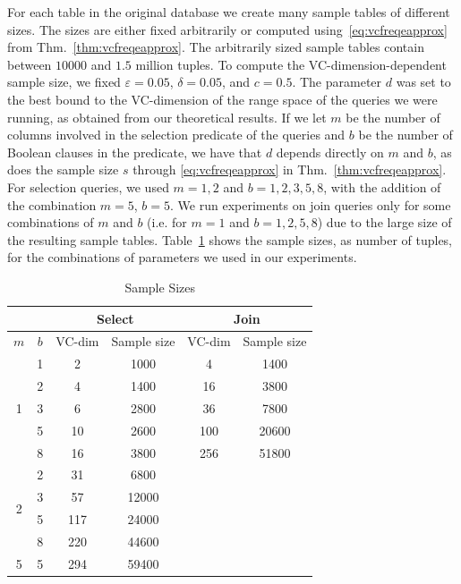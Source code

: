 For each table in the original database we create many sample tables of
different sizes. The sizes are either fixed arbitrarily or computed
using~\eqref{eq:vcfreqeapprox} from Thm.~\ref{thm:vcfreqeapprox}. The arbitrarily sized
sample tables contain between $10000$ and $1.5$ million tuples. To compute the
VC-dimension-dependent sample size, we fixed $\varepsilon=0.05$,
$\delta=0.05$, and $c=0.5$. The parameter $d$ was set to the best bound to the
VC-dimension of the range space of the queries we were running, as obtained from
our theoretical results. If we let $m$ be the number of columns involved in the
selection predicate of the queries and $b$ be the number of Boolean clauses in
the predicate, we have that $d$ depends directly on $m$ and $b$, as does the
sample size $s$ through \eqref{eq:vcfreqeapprox} in Thm.~\ref{thm:vcfreqeapprox}. For
selection queries, we used $m=1,2$ and $b=1,2,3,5,8$, with the addition of the
combination $m=5$, $b=5$. We run experiments on join queries only for some
combinations of $m$ and $b$ (i.e. for $m=1$ and $b=1,2,5,8$) due to the large
size of the resulting sample tables. Table~\ref{tab:samplesize} shows the sample
sizes, as number of tuples, for the combinations of parameters we used in our
experiments.

\begin{table}[ht]
  \centering
  \begin{tabular}{|c|c|cc|cc|}
    \cline{3-6}
    \multicolumn{2}{c}{$ $} &
    \multicolumn{2}{|c}{Select} &
    \multicolumn{2}{|c|}{Join} \\
    \hline
    $m$ & $b$ & VC-dim & Sample size & VC-dim & Sample size \\
    \hline
    \multirow{5}{*}{1} & 1 & 2 & 1000 & 4 & 1400\\
     & 2 & 4 & 1400 & 16 & 3800\\
     & 3 & 6 & 2800 & 36 & 7800 \\
     & 5 & 10 & 2600 & 100 & 20600\\
     & 8 & 16 & 3800 & 256 & 51800\\
    \hline
    \multirow{4}{*}{2} & 2 & 31 & 6800  & & \\
     & 3 & 57 & 12000 & & \\
     & 5 & 117 & 24000 & & \\
     & 8 & 220 & 44600 & & \\
    \hline
    5 & 5 & 294 & 59400 & & \\
    \hline
  \end{tabular}
  \caption{Sample Sizes}
  \label{tab:samplesize}
\end{table}
 
